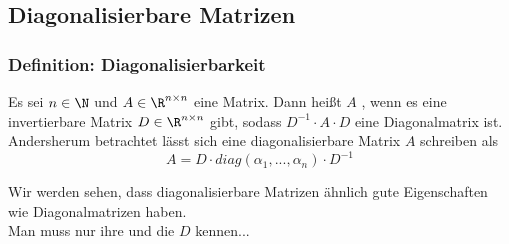 \subsection{Diagonalisierbare Matrizen}
%
\begin{frame}\frametitle{Definition: Diagonalisierbarkeit}
Es sei $n \in \N$ und $A \in \R^{n\times n}$ eine Matrix. Dann heißt $A$ , wenn es eine invertierbare Matrix $D \in \R^{n\times n}$ gibt, sodass $D^{-1}\cdot A \cdot D$ eine Diagonalmatrix ist.\\\pause \vfill
Andersherum betrachtet lässt sich eine diagonalisierbare Matrix $A$ schreiben als
$$
A=D\cdot diag(\alpha_1,...,\alpha_n)\cdot D^{-1}
$$

\pause\vfill
Wir werden sehen, dass diagonalisierbare Matrizen ähnlich gute Eigenschaften wie Diagonalmatrizen haben.\\\vspace{5mm}
Man muss nur ihre  und die  $D$ kennen...
\end{frame}
%

